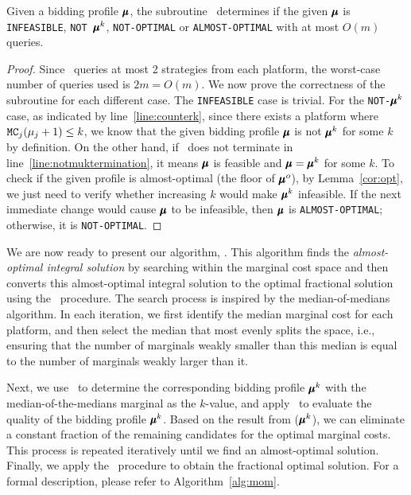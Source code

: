 \begin{lemma}\label{lem:optcheck}
Given a bidding profile $\pmb{\mu}$, the subroutine \optcheck\ determines if the given $\pmb{\mu}$ is \texttt{INFEASIBLE}, \texttt{NOT $\pmb{\mu}^k$}, \texttt{NOT-OPTIMAL} or \texttt{ALMOST-OPTIMAL} with at most $O(m)$ queries.
\end{lemma}
\begin{proof}
Since \optcheck\ queries at most 2 strategies from each platform, the worst-case number of queries used is \(2m = O(m)\). We now prove the correctness of the subroutine for each different case. The \texttt{INFEASIBLE} case is trivial. For the \texttt{NOT-$\pmb{\mu}^k$} case, as indicated by line~\ref{line:counterk}, since there exists a platform where \(\texttt{MC}_j(\mu_j + 1) \leq k\), we know that the given bidding profile \(\pmb{\mu}\) is not \(\pmb{\mu}^k\) for some \(k\) by definition. On the other hand, if \optcheck\ does not terminate in line~\ref{line:notmuktermination}, it means \(\pmb{\mu}\) is feasible and \(\pmb{\mu} = \pmb{\mu}^k\) for some \(k\). To check if the given profile is almost-optimal (the floor of $\mathbf{\pmb{\mu}}^o$), by Lemma~\ref{cor:opt}, we just need to verify whether increasing \(k\) would make \(\pmb{\mu}^k\) infeasible. If the next immediate change would cause \(\pmb{\mu}\) to be infeasible, then \(\pmb{\mu}\) is \texttt{ALMOST-OPTIMAL}; otherwise, it is \texttt{NOT-OPTIMAL}. 
\end{proof}
We are now ready to present our algorithm, \mom. This algorithm finds the \emph{almost-optimal integral solution} by searching within the marginal cost space and then converts this almost-optimal integral solution to the optimal fractional solution using the \roundup\ procedure. The search process is inspired by the median-of-medians algorithm. In each iteration, we first identify the median marginal cost for each platform, and then select the median that most evenly splits the space, i.e., ensuring that the number of marginals weakly smaller than this median is equal to the number of marginals weakly larger than it.

Next, we use \matchingmc\ to determine the corresponding bidding profile $\pmb{\mu}^k$ with the median-of-the-medians marginal as the $k$-value, and apply \optcheck\ to evaluate the quality of the bidding profile $\pmb{\mu}^k$. Based on the result from \optcheck($ \pmb{\mu}^k $), we can eliminate a constant fraction of the remaining candidates for the optimal marginal costs. This process is repeated iteratively until we find an almost-optimal solution. Finally, we apply the \roundup\ procedure to obtain the fractional optimal solution. For a formal description, please refer to Algorithm~\ref{alg:mom}.

